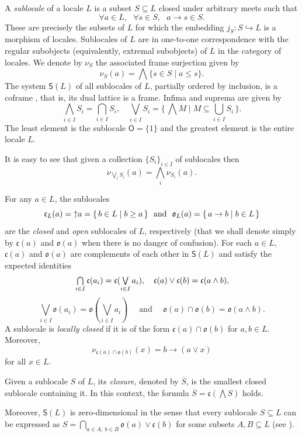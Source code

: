 \documentclass[11pt,a4paper,reqno]{amsart}
\newcommand{\newuparrow}{{{\rlap{$\ $}\hbox{$\uparrow$}}}}%
\newcommand{\set}[1]{\{\,#1\,\}}
\newcommand{\tbigwedge}{\mathop{\textstyle \bigwedge }}%
\newcommand{\tbigcap}{\mathop{\textstyle \bigcap }}%
\newcommand{\tbigcup}{\mathop{\textstyle \bigcup }}%
\newcommand{\tbigvee}{\mathop{\textstyle \bigvee }}%
\def\SS{\mathsf{S}}
\def\cl{\mathfrak{c}}
\def\op{\mathfrak{o}}
\theoremstyle{definition}
\theoremstyle{remark}
\newcommand{\ve}{\vee}
\begin{document}
A \emph{sublocale} of a locale $L$ is a subset $S\subseteq L$ closed under arbitrary meets such that
\[\forall a\in L,\ \ \ \forall s\in S,\  \ \ a\to s\in S.\]
These are precisely the subsets of $L$ for which the embedding $j_S\colon S\hookrightarrow L$ is a morphism of locales. Sublocales of $L$ are in one-to-one correspondence with the regular subobjects (equivalently, extremal subobjects) of $L$ in the category of locales. We denote by $\nu_S$  the associated frame surjection
given by
$$\nu_S(a)=\tbigwedge\{s\in S\mid a\leq s\}.$$
The system $\SS  (L)$ of all sublocales of $L$, partially ordered by inclusion, is a coframe \cite[Theorem~III.3.2.1]{PP12}, that is, its dual lattice is a frame.  Infima and suprema are given by
\[
\tbigwedge_{i\in I}S_i=\tbigcap_{i\in I}S_i, \quad \tbigvee_{i\in I}S_i=\set{\tbigwedge M\mid M\subseteq\tbigcup_{i\in I} S_i}.
\]
The least element is the sublocale $\mathsf{O}=\{1\}$ and the greatest element is the entire locale $L$. 

It is easy to see that given a collection $\{S_i\}_{i\in I}$ of sublocales then $$\nu_{\tbigvee_i S_i}(a)=\tbigwedge_i\nu_{S_i}(a).$$


For any $a\in L$, the sublocales
\[
\mathfrak{c}_L(a)=\newuparrow  a=\set{b\in L\mid b\ge a}\ \text{ and }\ \mathfrak{o}_L(a)=\set{a\to b\mid b\in L}
\]
are the \emph{closed} and \emph{open} sublocales of $L$, respectively (that we shall denote simply by $\mathfrak{c}(a)$ and $\mathfrak{o}(a)$ when there is no danger of confusion). For each $a\in L$, $\mathfrak{c}(a)$ and $\mathfrak{o}(a)$ are
complements of each other in $\SS(L)$
and satisfy the expected identities
\begin{equation*}{\label{identities.basic}}
\tbigcap_{i\in I} \mathfrak{c}(a_i)=\cl(\tbigvee_{i\in I} a_i),\quad \cl(a)\vee\cl(b)=\cl(a\wedge b),
\end{equation*}
\[\tbigvee_{i\in I}\op(a_i)=\op(\tbigvee_{i\in I} a_i) \quad\mbox{ and }\quad \op(a)\cap \op(b)=\op(a\wedge b).
\]
A sublocale is \emph{locally closed} if it is of the form $\cl(a)\cap\op(b)$ for $a,b\in L$.
Moreover, $$\nu_{\cl(a)\cap\op(b)}(x)= b\to (a\vee x)$$
for all $x\in L$.

Given a sublocale $S$ of $L$, its \emph{closure}, denoted by $\overline{S}$, is the smallest closed sublocale containing it. In this context, the formula $\overline{S}=\cl(\tbigwedge S)$ holds.

Moreover, $\SS(L)$ is zero-dimensional in the sense that every sublocale $S\subseteq L$ can be expressed as $S=\tbigcap_{a\in A,\ b\in B}\op(a)\ve\cl(b)$ for some subsets $A,B\subseteq L$ (see \cite[Proposition~III.6.5]{PP12}).
\end{document}
